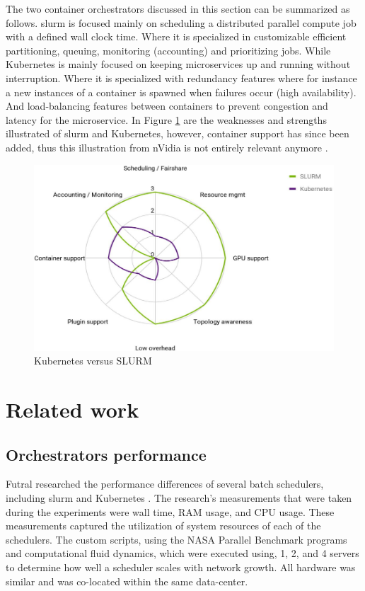 \documentclass[conference]{IEEEtran}
\begin{document}
The two container orchestrators discussed in this section can be summarized as follows. \gls{slurm} is focused mainly on scheduling a distributed parallel compute job with a defined wall clock time. Where it is specialized in customizable efficient partitioning, queuing, monitoring (accounting) and prioritizing jobs. While Kubernetes is mainly focused on keeping microservices up and running without interruption. Where it is specialized with redundancy features where for instance a new instances of a container is spawned when failures occur (high availability). And load-balancing features between containers to prevent congestion and latency for the microservice. In Figure \ref{fig:kube_vs_slurm} are the weaknesses and strengths illustrated of \gls{slurm} and Kubernetes, however, container support has since been added, thus this illustration from nVidia is not entirely relevant anymore \cite{nvidia-slurm-containers}.

\begin{figure}[H]
\centering
\includegraphics[width=\columnwidth]{images/hpc_vs_data_science.png}
\caption{Kubernetes versus SLURM}
\label{fig:kube_vs_slurm}
\end{figure}


\section{Related work}
\subsection{Orchestrators performance}
Futral researched the performance differences of several batch schedulers, including \gls{slurm} and Kubernetes \cite{futral2019method}. The research's measurements that were taken during the experiments were wall time, RAM usage, and CPU usage. These measurements captured the utilization of system resources of each of the schedulers. The custom scripts, using the NASA Parallel Benchmark programs and computational fluid dynamics, which were executed using, 1, 2, and 4 servers to determine how well a scheduler scales with network growth. All hardware was similar and was co-located within the same data-center.
\end{document}
